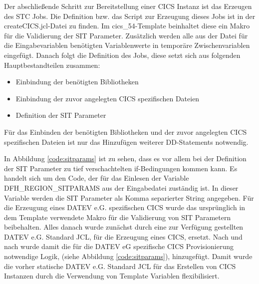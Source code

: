 \begin{minipage}{\linewidth}

\end{minipage}

Der abschließende Schritt zur Bereitstellung einer CICS Instanz ist das Erzeugen des STC Jobs.
Die Definition bzw. das Script zur Erzeugung dieses Jobs ist in der \glqq createCICS.jcl\grqq-Datei zu finden.
Im \glqq cics\_54\grqq-Template beinhaltet diese ein Makro für die Validierung der SIT Parameter.
Zusätzlich werden alle aus der Datei für die Eingabevariablen benötigten Variablenwerte in temporäre Zwischenvariablen eingefügt.
Danach folgt die Definition des Jobs, diese setzt sich aus folgenden Hauptbestandteilen zusammen:

\begin{itemize}
\item Einbindung der benötigten Bibliotheken
\item Einbindung der zuvor angelegten CICS spezifischen Dateien
\item Definition der SIT Parameter
\end{itemize}

Für das Einbinden der benötigten Bibliotheken und der zuvor angelegten CICS spezifischen Dateien ist nur das Hinzufügen weiterer DD-Statements notwendig.

In Abbildung \ref{code:sitparams} ist zu sehen, dass es vor allem bei der Definition der SIT Parameter zu tief verschachtelten if-Bedingungen kommen kann.
Es handelt sich um den Code, der für das Einlesen der Variable  \glqq DFH\_REGION\_SITPARAMS\grqq{} aus der Eingabedatei zuständig ist.
In dieser Variable werden die SIT Parameter als Komma separierter String angegeben.
Für die Erzeugung eines DATEV e.G. spezifischen CICS wurde das ursprünglich in dem Template verwendete Makro für die Validierung von SIT Parametern beibehalten.
Alles danach wurde zunächst durch eine zur Verfügung gestellten DATEV e.G. Standard JCL, für die Erzeugung eines CICS, ersetzt.
Nach und nach wurde damit die für die DATEV eG spezifische CICS Provisionierung notwendige Logik, (siehe Abbildung \ref{code:sitparams}), hinzugefügt.
Damit wurde die vorher statische DATEV e.G. Standard JCL für das Erstellen von CICS Instanzen durch die Verwendung von Template  Variablen flexibilisiert.

\begin{minipage}{\linewidth}

\end{minipage}

